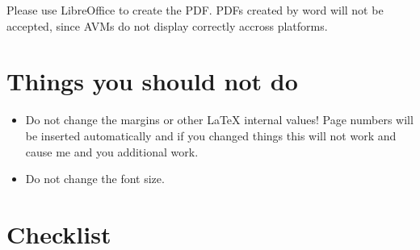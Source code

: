 \documentclass[11pt,a4paper,fleqn]{article}
\begin{document}
Please use LibreOffice to create the PDF. PDFs created by word will not be accepted, since AVMs do
not display correctly accross platforms.

\section{Things you should not do}

\begin{itemize}
\item Do not change the margins or other \LaTeX{} internal values! Page numbers will be inserted automatically and
      if you changed things this will not work and cause me and you additional work.
\item Do not change the font size.
\end{itemize}


\section{Checklist}
\end{document}
